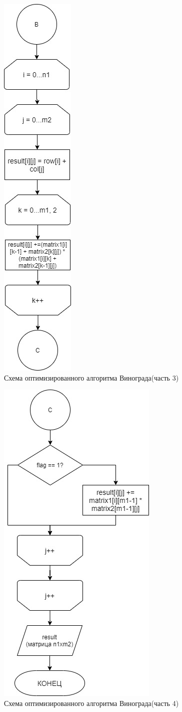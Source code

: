 \documentclass[12pt]{report}
\begin{document}
	\newpage
	
	\begin{figure}[h]
		\centering
		\includegraphics[width=0.18\linewidth]{vinopt3.jpg}
		\caption{Схема оптимизированного алгоритма Винограда(часть 3)}
		\label{fig:vinOpt3}
	\end{figure}
	
	\newpage 
	
	\begin{figure}[h]
		\centering
		\includegraphics[width=0.4\linewidth]{vinopt4.jpg}
		\caption{Схема оптимизированного алгоритма Винограда(часть 4)}
		\label{fig:vinOpt4}
	\end{figure}
	
\end{document}
